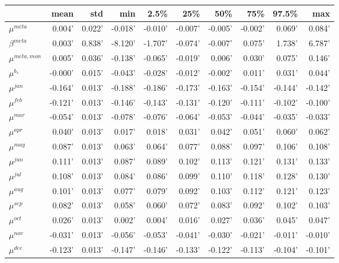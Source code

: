 \documentclass[a4paper]{article}
\begin{document}
\begin{table}
  \begin{tabular}{lrrrrrrrrr}
  \toprule
  {} &    mean &    std &     min &    2.5\% &     25\% &     50\% &     75\% &   97.5\% &     max \\
  \midrule
  $\mu^{meta}$     &  0.004' & 0.022' & -0.018' & -0.010' & -0.007' & -0.005' & -0.002' &  0.069' &  0.084' \\
  $\beta^{meta}$   &  0.003' & 0.838' & -8.120' & -1.707' & -0.074' & -0.007' &  0.075' &  1.738' &  6.787' \\
  $\mu^{meta,mon}$ &  0.005' & 0.036' & -0.138' & -0.065' & -0.019' &  0.006' &  0.030' &  0.075' &  0.146' \\
  $\mu^{b_s}$      & -0.000' & 0.015' & -0.043' & -0.028' & -0.012' & -0.002' &  0.011' &  0.031' &  0.044' \\
  $\mu^{jan}$      & -0.164' & 0.013' & -0.188' & -0.186' & -0.173' & -0.163' & -0.154' & -0.144' & -0.142' \\
  $\mu^{feb}$      & -0.121' & 0.013' & -0.146' & -0.143' & -0.131' & -0.120' & -0.111' & -0.102' & -0.100' \\
  $\mu^{mar}$      & -0.054' & 0.013' & -0.078' & -0.076' & -0.064' & -0.053' & -0.044' & -0.035' & -0.033' \\
  $\mu^{apr}$     &  0.040' & 0.013' &  0.017' &  0.018' &  0.031' &  0.042' &  0.051' &  0.060' &  0.062' \\
  $\mu^{may}$      &  0.087' & 0.013' &  0.063' &  0.064' &  0.077' &  0.088' &  0.097' &  0.106' &  0.108' \\
  $\mu^{jun}$      &  0.111' & 0.013' &  0.087' &  0.089' &  0.102' &  0.113' &  0.121' &  0.131' &  0.133' \\
  $\mu^{jul}$      &  0.108' & 0.013' &  0.084' &  0.086' &  0.099' &  0.110' &  0.118' &  0.128' &  0.130' \\
  $\mu^{aug}$      &  0.101' & 0.013' &  0.077' &  0.079' &  0.092' &  0.103' &  0.112' &  0.121' &  0.123' \\
  $\mu^{sep}$     &  0.082' & 0.013' &  0.058' &  0.060' &  0.072' &  0.083' &  0.092' &  0.102' &  0.103' \\
  $\mu^{oct}$      &  0.026' & 0.013' &  0.002' &  0.004' &  0.016' &  0.027' &  0.036' &  0.045' &  0.047' \\
  $\mu^{nov}$     & -0.031' & 0.013' & -0.056' & -0.053' & -0.041' & -0.030' & -0.021' & -0.011' & -0.010' \\
  $\mu^{dec}$     & -0.123' & 0.013' & -0.147' & -0.146' & -0.133' & -0.122' & -0.113' & -0.104' & -0.101' \\

\end{tabular}
\end{table}
\end{document}
